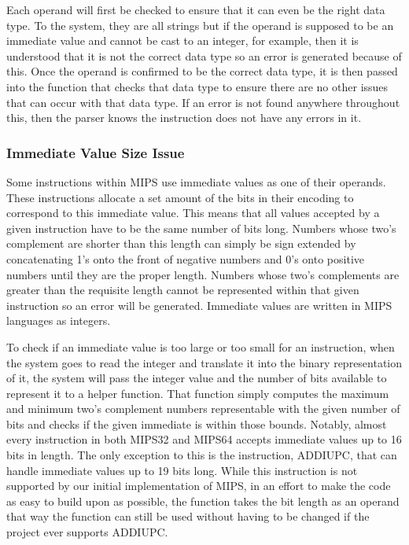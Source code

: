 \documentclass[
    parskip=half,
    fontsize=12pt,
    titlepage=firstiscover,
    toc=bibliography,
    numbers=endperiod
]{scrartcl}
\begin{document}
Each operand will first be checked to ensure that it can even be the
right data type. To the system, they are all strings but if the operand
is supposed to be an immediate value and cannot be cast to an integer,
for example, then it is understood that it is not the correct data type
so an error is generated because of this. Once the operand is confirmed
to be the correct data type, it is then passed into the function that
checks that data type to ensure there are no other issues that can occur
with that data type. If an error is not found anywhere throughout this,
then the parser knows the instruction does not have any errors in it.

\subsubsection{Immediate Value Size Issue}

Some instructions within MIPS use immediate values as one of their
operands. These instructions allocate a set amount of the bits in their
encoding to correspond to this immediate value. This means that all
values accepted by a given instruction have to be the same number of
bits long. Numbers whose two's complement are shorter than this length
can simply be sign extended by concatenating 1's onto the front of
negative numbers and 0's onto positive numbers until they are the proper
length. Numbers whose two's complements are greater than the requisite
length cannot be represented within that given instruction so an error
will be generated. Immediate values are written in MIPS languages as
integers.

To check if an immediate value is too large or too small for an
instruction, when the system goes to read the integer and translate it
into the binary representation of it, the system will pass the integer
value and the number of bits available to represent it to a helper
function. That function simply computes the maximum and minimum two's
complement numbers representable with the given number of bits and
checks if the given immediate is within those bounds. Notably, almost
every instruction in both MIPS32 and MIPS64 accepts immediate values up
to 16 bits in length. The only exception to this is the instruction,
ADDIUPC, that can handle immediate values up to 19 bits long. While this
instruction is not supported by our initial implementation of MIPS, in
an effort to make the code as easy to build upon as possible, the
function takes the bit length as an operand that way the function can
still be used without having to be changed if the project ever supports
ADDIUPC.
\end{document}

